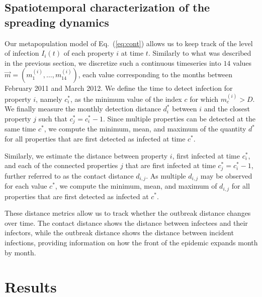 \documentclass[aps,physrev,reprint,superscriptaddress]{revtex4-1}
\begin{document}

\subsection{Spatiotemporal characterization of the spreading dynamics}


Our metapopulation model of Eq.~(\ref{eq:cont}) allows us to keep track of the level of infection $I_i(t)$ of each property $i$ at time $t$. Similarly to what was described in the previous section, we discretize such a continuous timeseries into $14$ values $\vec{m} = (m_1^{(i)}, \ldots, m_{14}^{(i)})$, each value corresponding to the months between February 2011 and March 2012. We define the time to detect infection for property $i$, namely  $c^*_i$, as the minimum value of the index $c$ for which $m_c^{(i)} > D$. We finally measure the monthly detection distance $d_i^*$ between $i$ and the closest property $j$ such that $c^*_j = c^*_i - 1$. Since multiple properties can be detected at the same time $c^*$, we compute the minimum, mean, and maximum of the quantity $d^*$ for all properties that are first detected as infected at time $c^*$. 

Similarly, we estimate the distance between property $i$, first infected at time $c_i^*$, and each of the connected properties $j$ that are first infected at time $c_j^* = c_i^*-1$, further referred to as the contact distance $d_{i,j}$. As multiple $d_{i,j}$ may be observed for each value $c^*$, we compute the minimum, mean, and maximum of $d_{i,j}$ for all properties that are first detected as infected at $c^*$. 

These distance metrics allow us to track whether the outbreak distance changes over time. The contact distance shows the distance between infectees and their infectors, while the outbreak distance shows the distance between incident infections, providing information on how the front of the epidemic expands month by month.




\section{Results}
\end{document}
